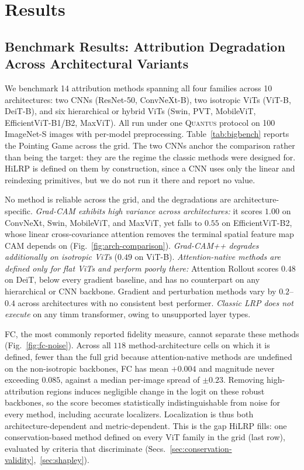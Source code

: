 \documentclass[lettersize,journal]{IEEEtran}
\theoremstyle{definition}
\theoremstyle{plain}
\begin{document}
\section{Results}
\label{sec:results}

\subsection{Benchmark Results: Attribution Degradation Across Architectural Variants}
\label{sec:baseline-landscape}
We benchmark 14 attribution methods spanning all four families across 10 architectures: two CNNs (ResNet-50, ConvNeXt-B), two isotropic ViTs (ViT-B, DeiT-B), and six hierarchical or hybrid ViTs (Swin, PVT, MobileViT, EfficientViT-B1/B2, MaxViT). All run under one \textsc{Quantus} protocol on 100 ImageNet-S images with per-model preprocessing. Table~\ref{tab:bigbench} reports the Pointing Game across the grid. The two CNNs anchor the comparison rather than being the target: they are the regime the classic methods were designed for. HiLRP is defined on them by construction, since a CNN uses only the linear and reindexing primitives, but we do not run it there and report no value.

No method is reliable across the grid, and the degradations are architecture-specific. \emph{Grad-CAM exhibits high variance across architectures:} it scores $1.00$ on ConvNeXt, Swin, MobileViT, and MaxViT, yet falls to $0.55$ on EfficientViT-B2, whose linear cross-covariance attention removes the terminal spatial feature map CAM depends on (Fig.~\ref{fig:arch-comparison}). \emph{Grad-CAM++ degrades additionally on isotropic ViTs} ($0.49$ on ViT-B). \emph{Attention-native methods are defined only for flat ViTs and perform poorly there:} Attention Rollout scores $0.48$ on DeiT, below every gradient baseline, and has no counterpart on any hierarchical or CNN backbone. Gradient and perturbation methods vary by $0.2$--$0.4$ across architectures with no consistent best performer. \emph{Classic LRP does not execute} on any timm transformer, owing to unsupported layer types.

FC, the most commonly reported fidelity measure, cannot separate these methods (Fig.~\ref{fig:fc-noise}). Across all $118$ method-architecture cells on which it is defined, fewer than the full grid because attention-native methods are undefined on the non-isotropic backbones, FC has mean $+0.004$ and magnitude never exceeding $0.085$, against a median per-image spread of $\pm0.23$. Removing high-attribution regions induces negligible change in the logit on these robust backbones, so the score becomes statistically indistinguishable from noise for every method, including accurate localizers. Localization is thus both architecture-dependent and metric-dependent. This is the gap HiLRP fills: one conservation-based method defined on every ViT family in the grid (last row), evaluated by criteria that discriminate (Secs.~\ref{sec:conservation-validity},~\ref{sec:shapley}).
\end{document}
